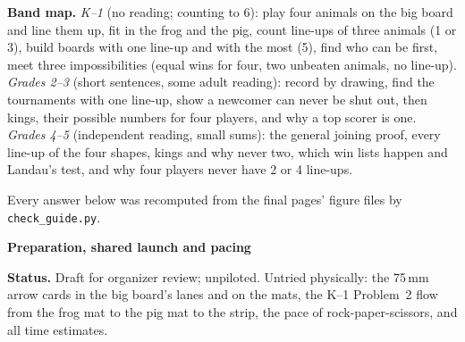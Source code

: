 \documentclass[11pt]{article}
\newcommand{\head}[1]{\par\needspace{6\baselineskip}\vspace{2pt}\textbf{\large #1}\par}
\begin{document}
\textbf{Band map.} \emph{K--1} (no reading; counting to 6): play four animals on the big board and line them up, fit in the frog and the pig, count line-ups of three animals (1 or 3), build boards with one line-up and with the most (5), find who can be first, meet three impossibilities (equal wins for four, two unbeaten animals, no line-up). \emph{Grades 2--3} (short sentences, some adult reading): record by drawing, find the tournaments with one line-up, show a newcomer can never be shut out, then kings, their possible numbers for four players, and why a top scorer is one. \emph{Grades 4--5} (independent reading, small sums): the general joining proof, every line-up of the four shapes, kings and why never two, which win lists happen and Landau's test, and why four players never have 2 or 4 line-ups.

Every answer below was recomputed from the final pages' figure files by \texttt{check\_guide.py}.

\head{Preparation, shared launch and pacing}
\textbf{Status.} Draft for organizer review; unpiloted. Untried physically: the 75\,mm arrow cards in the big board's lanes and on the mats, the K--1 Problem~2 flow from the frog mat to the pig mat to the strip, the pace of rock-paper-scissors, and all time estimates.
\end{document}
